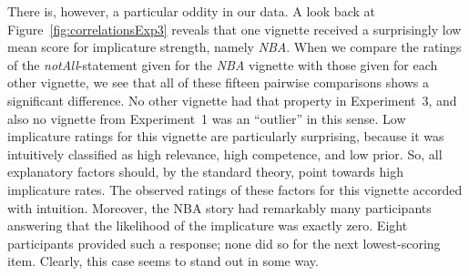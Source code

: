\documentclass[12pt]{article}
\begin{document}
There is, however, a particular oddity in our data. A look back at
Figure~\ref{fig:correlationsExp3} reveals that one vignette received a surprisingly low mean
score for implicature strength, namely \emph{NBA}. When we compare the ratings of the
\emph{notAll}-statement given for the \emph{NBA} vignette with those given for each other
vignette, we see that all of these fifteen pairwise comparisons shows a significant
difference. No other vignette had that property in Experiment~3, and also no vignette from
Experiment~1 was an ``outlier'' in this sense. Low implicature ratings for this vignette are
particularly surprising, because it was intuitively classified as high relevance, high
competence, and low prior. So, all explanatory factors should, by the standard theory, point
towards high implicature rates. The observed ratings of these factors for this vignette
accorded with intuition. Moreover, the NBA story had remarkably many participants answering
that the likelihood of the implicature was exactly zero. Eight participants provided such a
response; none did so for the next lowest-scoring item. Clearly, this case seems to stand out
in some way.


\end{document}
